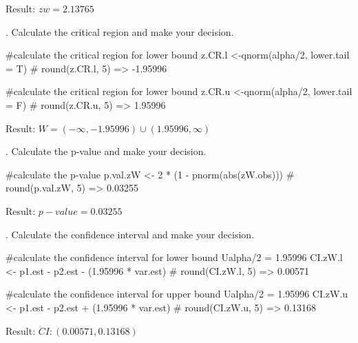 \documentclass[12pt, oneside]{report}\usepackage[]{graphicx}\usepackage[]{color}
\begin{document}
Result: $zw = 2.13765 $ \newline

. Calculate the critical region and make your decision.
\begin{Schunk}
\begin{Sinput}
#calculate the critical region for lower bound
z.CR.l <-qnorm(alpha/2, lower.tail = T)
# round(z.CR.l, 5) => -1.95996

#calculate the critical region for lower bound
z.CR.u <-qnorm(alpha/2, lower.tail = F)
# round(z.CR.u, 5) => 1.95996
\end{Sinput}
\end{Schunk}

Result: $W = (-\infty, -1.95996) \cup (1.95996, \infty) $ \newline

. Calculate the p-value and make your decision.
\begin{Schunk}
\begin{Sinput}
#calculate the p-value
p.val.zW <- 2 * (1 - pnorm(abs(zW.obs)))
# round(p.val.zW, 5) => 0.03255
\end{Sinput}
\end{Schunk}

Result: $p-value = 0.03255$ \newline

. Calculate the confidence interval and make your decision.
\begin{Schunk}
\begin{Sinput}
#calculate the confidence interval for lower bound Ualpha/2 = 1.95996
CI.zW.l <- p1.est - p2.est - (1.95996 * var.est)
# round(CI.zW.l, 5) => 0.00571

#calculate the confidence interval for upper bound Ualpha/2 = 1.95996
CI.zW.u <- p1.est - p2.est + (1.95996 * var.est)
# round(CI.zW.u, 5) => 0.13168
\end{Sinput}
\end{Schunk}

Result: $CI: (0.00571, 0.13168)$ \newline
\end{document}
